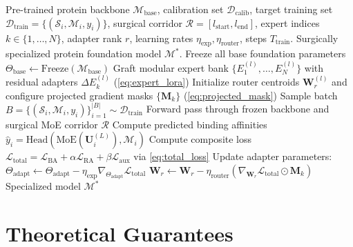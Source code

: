 \documentclass{article}
\theoremstyle{definition}
\begin{document}
\begin{algorithm}[t]
\caption{MEG-BAR: Molecular Expert Grafting with Router Re-anchoring}
\label{alg:megbar}
\begin{algorithmic}[1]
\REQUIRE Pre-trained protein backbone $\mathcal{M}_{\text{base}}$, calibration set $\mathcal{D}_{\text{calib}}$, target training set $\mathcal{D}_{\text{train}} = \{(\mathcal{S}_i, \mathcal{M}_i, y_i)\}$, surgical corridor $\mathcal{R} = [l_{\text{start}}, l_{\text{end}}]$, expert indices $k \in \{1, \dots, N\}$, adapter rank $r$, learning rates $\eta_{\text{exp}}, \eta_{\text{router}}$, steps $T_{\text{train}}$.
\ENSURE Surgically specialized protein foundation model $\mathcal{M}^*$.
\STATE Freeze all base foundation parameters $\Theta_{\text{base}} \leftarrow \text{Freeze}(\mathcal{M}_{\text{base}})$
    \STATE Graft modular expert bank $\{E_1^{(l)}, \dots, E_N^{(l)}\}$ with residual adapters $\Delta E_k^{(l)}$ (\cref{eq:expert_lora})
    \STATE Initialize router centroids $\mathbf{W}_r^{(l)}$ and configure projected gradient masks $\{\mathbf{M}_k\}$ (\cref{eq:projected_mask})
\ENDFOR
{}
    \STATE Sample batch $B = \{(\mathcal{S}_i, \mathcal{M}_i, y_i)\}_{i=1}^{|B|} \sim \mathcal{D}_{\text{train}}$
    \STATE Forward pass through frozen backbone and surgical MoE corridor $\mathcal{R}$
    \STATE Compute predicted binding affinities $\hat{y}_i = \text{Head}(\text{MoE}(\mathbf{U}_i^{(L)}), \mathcal{M}_i)$
    \STATE Compute composite loss $\mathcal{L}_{\text{total}} = \mathcal{L}_{\text{BA}} + \alpha \mathcal{L}_{\text{RA}} + \beta \mathcal{L}_{\text{aux}}$ via \cref{eq:total_loss}
    \STATE {}
    \STATE Update adapter parameters: $\Theta_{\text{adapt}} \leftarrow \Theta_{\text{adapt}} - \eta_{\text{exp}} \nabla_{\Theta_{\text{adapt}}} \mathcal{L}_{\text{total}}$
        \STATE $\mathbf{W}_r \leftarrow \mathbf{W}_r - \eta_{\text{router}} (\nabla_{\mathbf{W}_r} \mathcal{L}_{\text{total}} \odot \mathbf{M}_k)$ 
    \ENDFOR
\ENDFOR
\RETURN Specialized model $\mathcal{M}^*$
\end{algorithmic}
\end{algorithm}

\section{Theoretical Guarantees}
\label{sec:theory}
\end{document}
